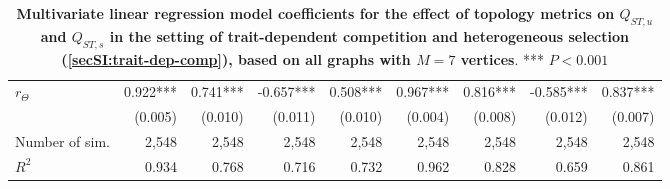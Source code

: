 \begin{table}[ht]
\begin{center}
{\begin{tabular}{|l||r|r|r|r|r|r|r|r|}
    $r_\Theta$  &                 0.922*** &                 0.741*** &                -0.657*** &                 0.508*** &                 0.967*** &                 0.816*** &                -0.585*** &                 0.837***\\ 
                &                  (0.005) &                  (0.010) &                  (0.011) &                  (0.010) &                  (0.004) &                  (0.008) &                  (0.012) &                  (0.007)\\ 
    \hline\hline
Number of sim.  &                    2,548 &                    2,548 &                    2,548 &                    2,548 &                    2,548 &                    2,548 &                    2,548 &                    2,548\\ 
    $R^2$       &                    0.934 &                    0.768 &                    0.716 &                    0.732 &                    0.962 &                    0.828 &                    0.659 &                    0.861\\ 
    \hline
    \end{tabular}}
  \end{center}
    \caption{ \textbf{Multivariate linear regression model coefficients for the effect of topology metrics on $Q_{ST,u}$ and $Q_{ST,s}$ in the setting of trait-dependent competition and heterogeneous selection (\cref{secSI:trait-dep-comp}), based on all graphs with $M=7$ vertices}.  *** $P < 0.001$}
\label{tableSI:coefficients_trait-dep-comp}
\end{table}

